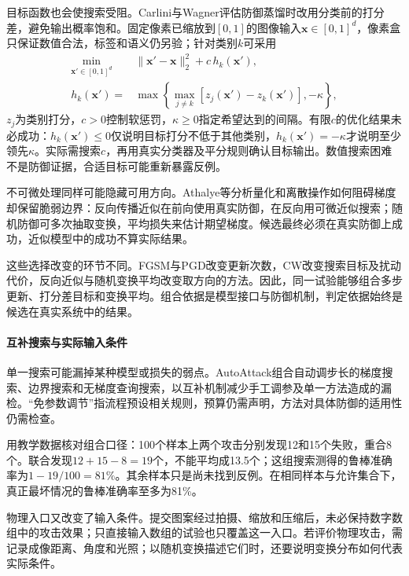 目标函数也会使搜索受阻。Carlini与Wagner评估防御蒸馏时改用分类前的打分差，避免输出概率饱和。固定像素已缩放到$[0,1]$的图像输入$\bm{x}\in[0,1]^d$，像素盒只保证数值合法，标签和语义仍另验；针对类别$k$可采用
\begin{equation}
 \begin{aligned}
 \min_{\bm{x}'\in[0,1]^d}\quad&
 \|\bm{x}'-\bm{x}\|_2^2+c\,h_k(\bm{x}'),\\
 h_k(\bm{x}')={}&
 \max\left\{\max_{j\ne k}
 [z_j(\bm{x}')-z_k(\bm{x}')],-\kappa\right\},
 \end{aligned}
 \label{eq:security-cw}
\end{equation}
$z_j$为类别打分，$c>0$控制软惩罚，$\kappa\geq0$指定希望达到的间隔。有限$c$的优化结果未必成功：$h_k(\bm{x}')\leq0$仅说明目标打分不低于其他类别，$h_k(\bm{x}')=-\kappa$才说明至少领先$\kappa$。实际需搜索$c$，再用真实分类器及平分规则确认目标输出。数值搜索困难不是防御证据，合适目标可能重新暴露反例。

不可微处理同样可能隐藏可用方向。Athalye等分析量化和离散操作如何阻碍梯度却保留脆弱边界：反向传播近似在前向使用真实防御，在反向用可微近似搜索；随机防御可多次抽取变换，平均损失来估计期望梯度。候选最终必须在真实防御上成功，近似模型中的成功不算实际结果。

这些选择改变的环节不同。FGSM与PGD改变更新次数，CW改变搜索目标及扰动代价，反向近似与随机变换平均改变取方向的方法。因此，同一试验能够组合多步更新、打分差目标和变换平均。组合依据是模型接口与防御机制，判定依据始终是候选在真实系统中的结果。

\paragraph{互补搜索与实际输入条件}

单一搜索可能漏掉某种模型或损失的弱点。AutoAttack组合自动调步长的梯度搜索、边界搜索和无梯度查询搜索，以互补机制减少手工调参及单一方法造成的漏检。“免参数调节”指流程预设相关规则，预算仍需声明，方法对具体防御的适用性仍需检查。

用教学数据核对组合口径：100个样本上两个攻击分别发现12和15个失败，重合8个。联合发现$12+15-8=19$个，不能平均成13.5个；这组搜索测得的鲁棒准确率为$1-19/100=81\%$。其余样本只是尚未找到反例。在相同样本与允许集合下，真正最坏情况的鲁棒准确率至多为81\%。

物理入口又改变了输入条件。提交图案经过拍摄、缩放和压缩后，未必保持数字数组中的攻击效果；只直接输入数组的试验也只覆盖这一入口。若评价物理攻击，需记录成像距离、角度和光照；以随机变换描述它们时，还要说明变换分布如何代表实际条件。

